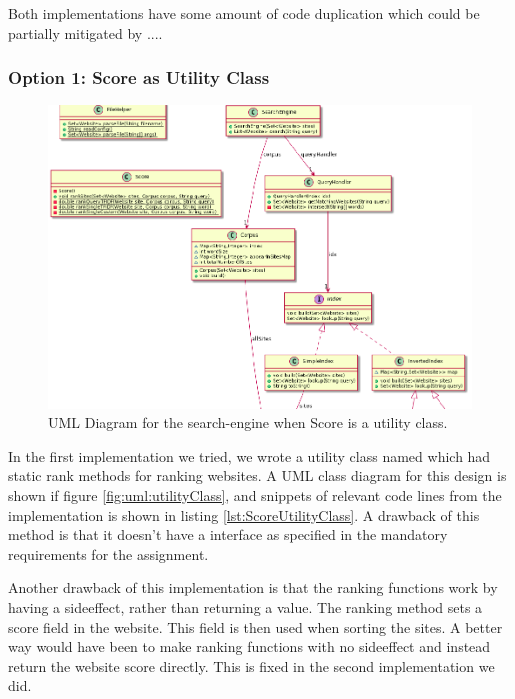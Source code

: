 Both implementations have some amount of code duplication which could be partially mitigated by ....


\subsubsection{Option 1: Score as Utility Class}
\begin{figure}[t]
	\centering
	\includegraphics[width=\textwidth]{graphics/uml/ScoreAsUtilityZoom.png}
	\caption{UML Diagram for the search-engine when Score is a utility class.}
	\label{fig:uml:ScoreAsUtility}
\end{figure}

In the first implementation we tried, we wrote a utility class named  which had static rank methods for ranking websites.   
A UML class diagram for this design is shown if figure \ref{fig:uml:utilityClass}, and snippets of relevant code lines from the implementation is shown in listing \ref{lst:ScoreUtilityClass}. 
A drawback of this method is that it doesn't have a  interface as specified in the mandatory requirements for the assignment.  

Another drawback of this implementation is that the ranking functions work by having a sideeffect, rather than returning a value. The ranking method sets a score field in the website. This field is then used when sorting the sites. A better way would have been to make ranking functions with no sideeffect and instead return the website score directly.
This is fixed in the second implementation we did.      

